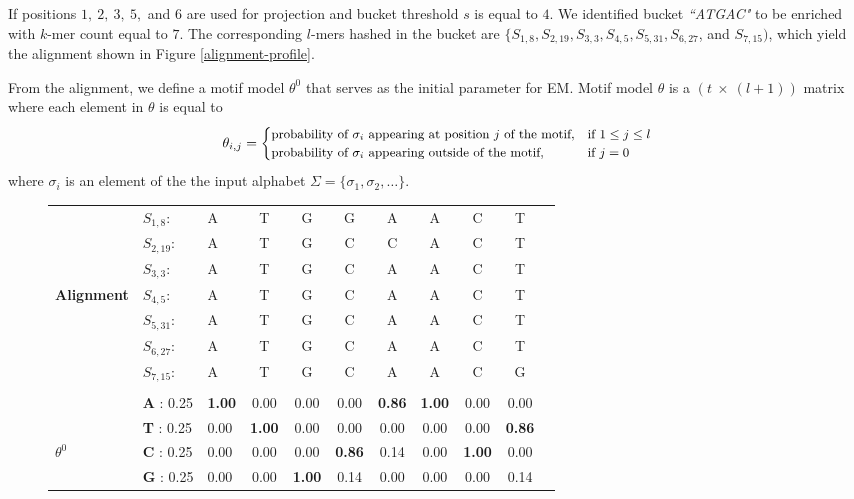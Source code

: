 \documentclass{llncs}
\begin{document}
{\begin{example}\label{exampleMotifModel}
If positions $1,\ 2,\ 3,\ 5,$ and $6$ are used for projection and bucket threshold $s$ is equal to $4$.
We identified bucket \textit{``ATGAC"} to be enriched with $k$-mer count equal to $7$. The corresponding $l$-mers hashed in the bucket are $\{S_{1,8}, S_{2,19}, S_{3,3} ,S_{4,5}, S_{5,31}, S_{6,27}$, and $S_{7,15})$, which yield the alignment shown in Figure \ref{alignment-profile}. 

From the alignment, we define a motif model $\theta^0$ that serves as the initial parameter for EM. Motif model $\theta$ is a $(t\ \times\ (l+1)) $ matrix where each element in $\theta$ is equal to 
\begin{equation*}\small
\theta_{i,j} = 
\begin{cases}
\text{probability of $\sigma_i$ appearing at position $j$ of the motif,}  &  \text{if $1 \leq j \leq l$}\\
\text{probability of $\sigma_i$ appearing outside of the motif,} & \text{if $j=0$}
\end{cases} 
\end{equation*}
\noindent where $\sigma_i$ is an element of the the input alphabet $\Sigma = \{\sigma_1, \sigma_2, \ldots\}$. 
\begin{figure}[h]
\begin{center}
\begin{small}
\begin{tabular}{l l l c c c c c c c c}
					&$S_{1,8}$: 	&	A&T&G&G&A&A&C&T\\
					&$S_{2,19}$:	&	A&T&G&C&C&A&C&T\\
					&$S_{3,3}$:	&	A&T&G&C&A&A&C&T\\
\textbf{Alignment}	&	$S_{4,5}$: &	A&T&G&C&A&A&C&T\\
					&	$S_{5,31}$: &	A&T&G&C&A&A&C&T\\
					&$S_{6,27}$: &	A&T&G&C&A&A&C&T\\
					&	$S_{7,15}$: &	A&T&G&C&A&A&C&G\\
					\hline \\
					& \textbf{A}	: 0.25 &	\textbf{1.00}&0.00&0.00&0.00&\textbf{0.86}&\textbf{1.00}&0.00&0.00 \\
					& \textbf{T}	: 0.25 &	0.00&\textbf{1.00}&0.00&0.00&0.00&0.00&0.00&\textbf{0.86}\\
\textbf{$\theta^{0}$}	& \textbf{C}	: 0.25 &	0.00&0.00&0.00&\textbf{0.86}&0.14&0.00&\textbf{1.00}&0.00\\
					& \textbf{G}	: 0.25&	0.00&0.00&\textbf{1.00}&0.14&0.00&0.00&0.00&0.14\\					

\end{tabular}
\end{small}
\end{center}
\end{figure}
\end{example}}
\end{document}
